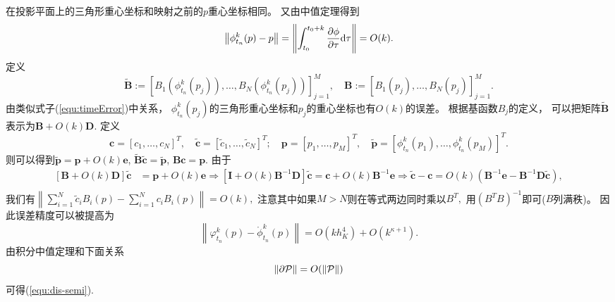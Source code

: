 \begin{pro}
在投影平面上的三角形重心坐标和映射之前的$p$重心坐标相同。
又由中值定理得到
\begin{equation}\label{equ:timeError}
  \left\lVert \phi^k_{t_n}(p)-p\right\rVert
  = \left\lVert \int_{t_0}^{t_0+k}
    \frac{\partial \phi}{\partial \tau}\textmd{d}\tau\right\rVert
  =O(k).
\end{equation}
定义
\begin{equation}
    \widetilde{\mathbf{B}}:=\left[B_1(\phi^k_{t_n}(p_j)),\ldots,B_N(\phi^k_{t_n}(p_j))\right]_{j=1}^{M},\quad
  \mathbf{B}:=\left[B_1(p_j),\ldots,B_N(p_j)\right]_{j=1}^{M}.
\end{equation}
由类似式子(\ref{equ:timeError})中关系，
$\phi^k_{t_n}(p_j)$的三角形重心坐标和$p_j$的重心坐标也有$O(k)$的误差。
根据基函数$B_j$的定义，
可以把矩阵$ \widetilde{\mathbf{B}}$表示为$\mathbf{B}+O(k)\mathbf{D}.$
定义
\begin{equation}
  \mathbf{c}=\left[c_1,\ldots,c_N\right]^{T},\quad
  \widetilde{\mathbf{c}}=\left[\widetilde{c}_1,\ldots,
    \widetilde{c}_N\right]^{T};\quad
  \mathbf{p}=\left[p_1,\ldots,p_M\right]^{T},\quad
\widetilde{\mathbf{p}}=\left[\phi^k_{t_n}(p_1),\ldots,
    \phi^k_{t_n}(p_M)\right]^{T}.
\end{equation}
则可以得到$\widetilde{\mathbf{p}}= \mathbf{p}+O(k)\mathbf{e}$,
$\widetilde{\mathbf{B}}\widetilde{\mathbf{c}}=\widetilde{\mathbf{p}}$,
$\mathbf{B}\mathbf{c}=\mathbf{p}.$
由于
\begin{displaymath}
  \begin{aligned}
    \left[\mathbf{B}+O(k)\mathbf{D}\right]   \widetilde{\mathbf{c}}
    &=\mathbf{p}+O(k)\mathbf{e}\Rightarrow
    \left[\mathbf{I}+O(k)\mathbf{B}^{-1}\mathbf{D}\right]
    \widetilde{\mathbf{c}}=\mathbf{c}+O(k) \mathbf{B}^{-1}\mathbf{e}
    \Rightarrow \widetilde{\mathbf{c}}-\mathbf{c}
    =O(k)\left(\mathbf{B}^{-1}\mathbf{e}-
      \mathbf{B}^{-1}\mathbf{D}\mathbf{\widetilde{c}}\right),\\
  \end{aligned}
\end{displaymath}
我们有$\left\lVert\sum_{i=1}^{N}\tilde{c}_iB_i\left(p\right)
  -\sum_{i=1}^{N}c_iB_i(p)\right\rVert=O(k),$
注意其中如果$M>N$则在等式两边同时乘以$B^T,$
用$(B^TB)^{-1}$即可($B$列满秩)。
因此误差精度可以被提高为
\begin{equation}
 \left\lVert\varphi^k_{t_n}(p)-\mathring{\phi}^k_{t_n}(p)
     \right\rVert=O(kh_K^4)+O(k^{\kappa+1}).
   \end{equation}
由积分中值定理和下面关系
\begin{equation}
  \label{eq:constant}
\lVert \partial {\cal P}\rVert = O(\lVert {\cal P}\rVert )
\end{equation}
可得(\ref{equ:dis-semi}).
\end{pro}

